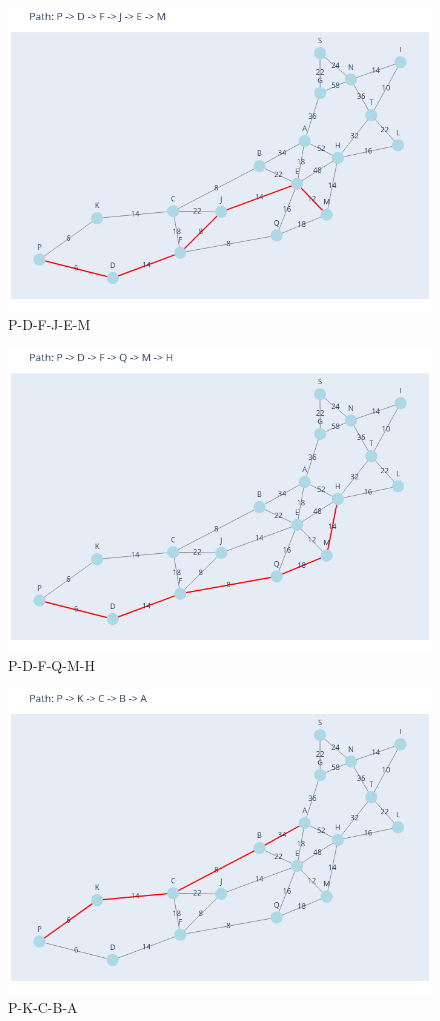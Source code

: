 \documentclass[11pt]{book}
\renewcommand{\=}[1]{\stackrel{#1}{=}} %
\theoremstyle{definition}
\theoremstyle{remark}
\begin{document}
\begin{figure}
    \centering
    \includegraphics[width=0.7\linewidth]{Plots/P_D_F_J_E_M.png}
    \caption{P-D-F-J-E-M}
    \label{fig:enter-label}
\end{figure}
\begin{figure}
    \centering
    \includegraphics[width=0.7\linewidth]{Plots/P_D_F_Q_M_H.png}
    \caption{P-D-F-Q-M-H}
    \label{fig:enter-label}
\end{figure}
\begin{figure}
    \centering
    \includegraphics[width=0.7\linewidth]{Plots/P_K_C_B_A.png}
    \caption{P-K-C-B-A}
    \label{fig:enter-label}
\end{figure}
\end{document}
